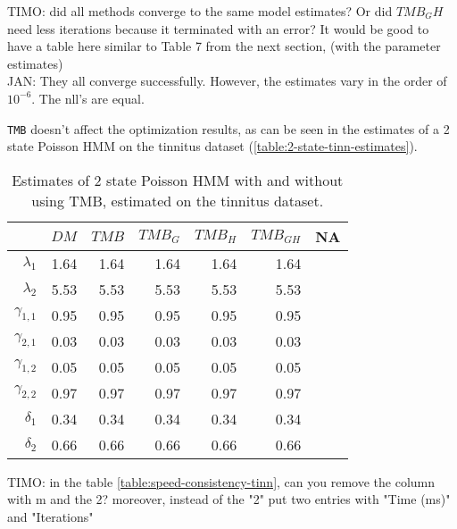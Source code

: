 \documentclass[bimj,fleqn]{w-art}\usepackage[]{graphicx}\usepackage[]{color}
\theoremstyle{plain}
\theoremstyle{definition}
\begin{document}
TIMO: did all methods converge to the same model estimates? Or did $TMB_GH$ need less iterations because it terminated with an error? It would be good to have a table here similar to Table 7 from the next section, (with the parameter estimates)\\[1ex]
JAN: They all converge successfully. However, the estimates vary in the order of $10^{-6}$. The nll's are equal.

{\tt{TMB}} doesn't affect the optimization results, as can be seen in the estimates of a 2 state Poisson HMM on the tinnitus dataset (\autoref{table:2-state-tinn-estimates}).

\begin{table}[ht]
\centering
\begin{tabular}{rrrrrrr}
  \hline
 & \textit{${DM}$} & \textit{${TMB}$} & \textit{${TMB_G}$} & \textit{${TMB_H}$} & \textit{${TMB_{GH}}$} & NA \\ 
  \hline
$\lambda_{1}$ & 1.64 & 1.64 & 1.64 & 1.64 & 1.64 &  \\ 
  $\lambda_{2}$ & 5.53 & 5.53 & 5.53 & 5.53 & 5.53 &  \\ 
  $\gamma_{1, 1}$ & 0.95 & 0.95 & 0.95 & 0.95 & 0.95 &  \\ 
  $\gamma_{2, 1}$ & 0.03 & 0.03 & 0.03 & 0.03 & 0.03 &  \\ 
  $\gamma_{1, 2}$ & 0.05 & 0.05 & 0.05 & 0.05 & 0.05 &  \\ 
  $\gamma_{2, 2}$ & 0.97 & 0.97 & 0.97 & 0.97 & 0.97 &  \\ 
  $\delta_{1}$ & 0.34 & 0.34 & 0.34 & 0.34 & 0.34 &  \\ 
  $\delta_{2}$ & 0.66 & 0.66 & 0.66 & 0.66 & 0.66 &  \\ 
   \hline
\end{tabular}
\caption{Estimates of 2 state Poisson HMM with and without using TMB, estimated on the tinnitus dataset.} 
\label{table:2-state-tinn-estimates}
\end{table}


TIMO: in the table \autoref{table:speed-consistency-tinn}, can you remove the column with m and the 2? moreover, instead of the "2" put two entries with "Time (ms)" and "Iterations"\\[1ex]
\end{document}
